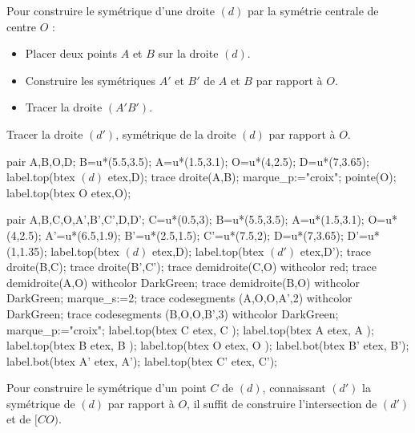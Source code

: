 \begin{methode*1}
    Pour construire le symétrique d'une droite $(d)$ par la symétrie centrale de centre $O$ :
    \begin{itemize}
        \item Placer deux points $A$ et $B$ sur la droite $(d)$.
        \item Construire les symétriques $A'$ et $B'$ de $A$ et $B$ par rapport à $O$.
        \item Tracer la droite $(A'B')$.
    \end{itemize}
    \exercice
    Tracer la droite $(d')$, symétrique de la droite $(d)$ par rapport à $O$. 
    
    \bigskip
    \begin{Geometrie}[CoinHD={(8u,4u)}]
        pair A,B,O,D;
        B=u*(5.5,3.5);
        A=u*(1.5,3.1);
        O=u*(4,2.5);
        D=u*(7,3.65);
        label.top(btex $(d)$ etex,D);
        trace droite(A,B);
        marque_p:="croix";
        pointe(O);
        label.top(btex O etex,O);
    \end{Geometrie}    
    \correction
    \phantom{rrr}

    \begin{Geometrie}[CoinHD={(8u,4u)}]
        pair A,B,C,O,A',B',C',D,D';
        C=u*(0.5,3);
        B=u*(5.5,3.5);
        A=u*(1.5,3.1);
        O=u*(4,2.5);
        A'=u*(6.5,1.9);
        B'=u*(2.5,1.5);
        C'=u*(7.5,2);
        D=u*(7,3.65);
        D'=u*(1,1.35);
        label.top(btex $(d)$ etex,D);
        label.top(btex $(d')$ etex,D');
        trace droite(B,C);
        trace droite(B',C');
        trace demidroite(C,O) withcolor red;
        trace demidroite(A,O) withcolor DarkGreen;
        trace demidroite(B,O) withcolor DarkGreen;
        marque_s:=2;
        trace codesegments (A,O,O,A',2) withcolor DarkGreen;
        trace codesegments (B,O,O,B',3) withcolor DarkGreen;
        marque_p:="croix";
        label.top(btex C  etex, C );
        label.top(btex A  etex, A );
        label.top(btex B  etex, B );
        label.top(btex O  etex, O );
        label.bot(btex B' etex, B');
        label.bot(btex A' etex, A');
        label.top(btex C' etex, C');
    \end{Geometrie}
\end{methode*1}

\begin{remarque}
    Pour construire le symétrique d'un point $C$ de $(d)$, connaissant $(d')$ la symétrique de $(d)$ par rapport à $O$, il suffit de construire l'intersection de $(d')$ et de $[CO)$.    
\end{remarque}

